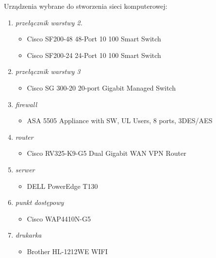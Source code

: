 \documentclass[a4paper, 12pt]{article}
\begin{document}
\indent Urządzenia wybrane do stworzenia sieci komputerowej:
\begin{enumerate}
	\item \textit{przełącznik warstwy 2.} 
	\begin{itemize}
	\item Cisco SF200-48 48-Port 10 100 Smart Switch %
	\item Cisco SF200-24 24-Port 10 100 Smart Switch %
	\end{itemize}
	
    \item \textit{przełącznik warstwy 3} 
    \begin{itemize}
	\item Cisco SG 300-20 20-port Gigabit Managed Switch
	\end{itemize}
    
    \item \textit{firewall} 
	\begin{itemize}
	\item ASA 5505 Appliance with SW, UL Users, 8 ports, 3DES/AES %
	\end{itemize}    
    
    \item \textit{router} 
	\begin{itemize}
	\item Cisco RV325-K9-G5 Dual Gigabit WAN VPN Router %
	\end{itemize}   
    
    \item \textit{serwer} 
	\begin{itemize}
	\item DELL PowerEdge T130 %
	\end{itemize}   
   
    \item \textit{punkt dostępowy} 
	\begin{itemize}
	\item Cisco WAP4410N-G5 %
	\end{itemize}   
    
    \item \textit{drukarka} 
	\begin{itemize}
	\item Brother HL-1212WE WIFI %
	\end{itemize}   
\end{enumerate}
\end{document}
